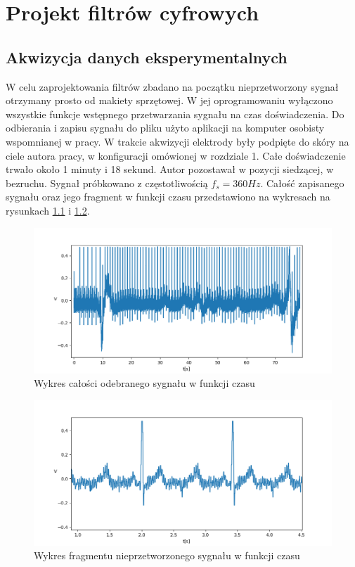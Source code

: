 
\chapter{Projekt filtrów cyfrowych}

\section{Akwizycja danych eksperymentalnych}

W celu zaprojektowania filtrów zbadano na początku nieprzetworzony sygnał otrzymany prosto
od makiety sprzętowej. W jej oprogramowaniu wyłączono wszystkie funkcje wstępnego przetwarzania
sygnału na czas doświadczenia.
Do odbierania i zapisu sygnału do pliku użyto aplikacji na komputer osobisty wspomnianej w pracy.
W trakcie akwizycji elektrody były podpięte do skóry na ciele autora pracy, w konfiguracji
omówionej w rozdziale 1. Całe doświadczenie trwało około 1 minuty i 18 sekund. Autor pozostawał
w pozycji siedzącej, w bezruchu. Sygnał próbkowano z częstotliwością $f_s = 360Hz$. 
Całość zapisanego sygnału oraz jego fragment w funkcji czasu przedstawiono na wykresach na rysunkach
\ref{fig:sigall} i \ref{fig:sigpart}.

\begin{figure}[h!]
    \centering 
    \includegraphics[scale=0.45]{pl/media/sigall.png}
    \caption{Wykres całości odebranego sygnału w funkcji czasu}
    \label{fig:sigall}
\end{figure}

\begin{figure}[h!]
    \centering 
    \includegraphics[scale=0.45]{pl/media/sig_unfiltered.png}
    \caption{Wykres fragmentu nieprzetworzonego sygnału w funkcji czasu}
    \label{fig:sigpart}
\end{figure}

